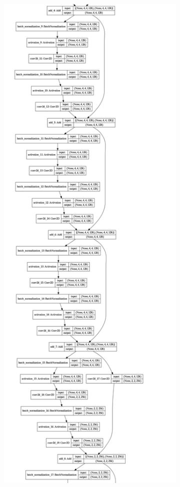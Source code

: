 \begin{figure}[ht]
\begin{subfigure}{.24\linewidth}
        \label{subfig:model0}
    \end{subfigure}
    \begin{subfigure}{.24\linewidth}
    \centering
        \includegraphics[scale=.1]{graphics/model_cropped_1.png}

\end{subfigure}
\end{figure}
